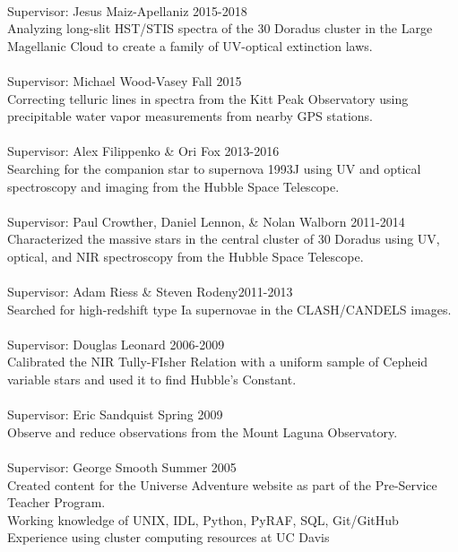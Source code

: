 \documentclass[10pt]{cv}
\begin{document}
\begin{llist}
\\
Supervisor: Jesus Maiz-Apellaniz \hfill 2015-2018\\
Analyzing long-slit HST/STIS spectra of the 30 Doradus cluster in 
the Large Magellanic Cloud to create a family of UV-optical extinction laws. \\
\\
Supervisor: Michael Wood-Vasey \hfill Fall 2015\\
Correcting telluric lines in spectra from the Kitt Peak Observatory using
precipitable water vapor measurements from nearby GPS stations.\\
\\
Supervisor: Alex Filippenko \& Ori Fox \hfill 2013-2016\\
Searching for the companion star to supernova 1993J using UV and optical 
spectroscopy and imaging from the Hubble Space Telescope.\\
\\
Supervisor: Paul Crowther, Daniel Lennon, \& Nolan Walborn \hfill 2011-2014\\
Characterized the massive stars in the central cluster of 30 Doradus using 
UV, optical, and NIR spectroscopy from the Hubble Space Telescope.\\
\\
Supervisor: Adam Riess \& Steven Rodeny\hfill 2011-2013\\
Searched for high-redshift type Ia supernovae in the CLASH/CANDELS images.\\
\\
Supervisor: Douglas Leonard \hfill 2006-2009 \\
Calibrated the NIR Tully-FIsher Relation with a uniform sample of Cepheid 
variable stars and used it to find Hubble's Constant.\\
\\
Supervisor: Eric Sandquist \hfill Spring 2009\\
Observe and reduce observations from the Mount Laguna Observatory. \\ 
\\
Supervisor: George Smooth \hfill Summer 2005\\
Created content for the Universe Adventure website as part of the 
Pre-Service Teacher Program.\\
\vspace{-0.1in}  
Working knowledge of UNIX, IDL, Python, PyRAF, SQL, Git/GitHub\\
Experience using cluster computing resources at UC Davis\\ 

\end{llist}
\end{document}
